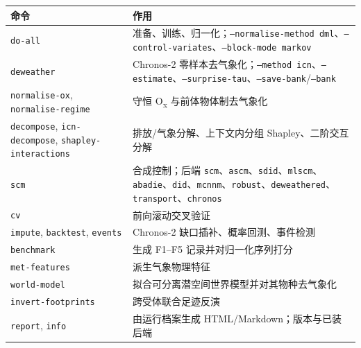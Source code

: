 \documentclass[11pt]{ctexrep}
\newcommand{\codeunderscore}{\textunderscore\allowbreak}
\newcommand{\code}[1]{\texttt{\let\_\codeunderscore #1}}
\begin{document}
\begin{center}\small
\begin{tabular}{@{}p{3.5cm}p{11.4cm}@{}}
\toprule
命令 & 作用 \\
\midrule
\code{do-all} & 准备、训练、归一化；\code{--normalise-method dml}、\code{--control-variates}、\code{--block-mode markov} \\
\code{deweather} & Chronos-2 零样本去气象化；\code{--method icn}、\code{--estimate}、\code{--surprise-tau}、\code{--save-bank}/\code{--bank} \\
\code{normalise-ox}, \code{normalise-regime} & 守恒 O\textsubscript{x} 与前体物体制去气象化 \\
\code{decompose}, \code{icn-decompose}, \code{shapley-interactions} & 排放/气象分解、上下文内分组 Shapley、二阶交互分解 \\
\code{scm} & 合成控制；后端 \code{scm}、\code{ascm}、\code{sdid}、\code{mlscm}、\code{abadie}、\code{did}、\code{mcnnm}、\code{robust}、\code{deweathered}、\code{transport}、\code{chronos} \\
\code{cv} & 前向滚动交叉验证 \\
\code{impute}, \code{backtest}, \code{events} & Chronos-2 缺口插补、概率回测、事件检测 \\
\code{benchmark} & 生成 F1--F5 记录并对归一化序列打分 \\
\code{met-features} & 派生气象物理特征 \\
\code{world-model} & 拟合可分离潜空间世界模型并对其物种去气象化 \\
\code{invert-footprints} & 跨受体联合足迹反演 \\
\code{report}, \code{info} & 由运行档案生成 HTML/Markdown；版本与已装后端 \\
\bottomrule
\end{tabular}
\end{center}
\end{document}
